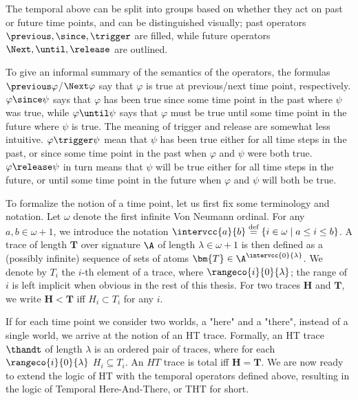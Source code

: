 The temporal above can be split into groups based on whether they act
on past or future time points, and can be distinguished visually; past
operators $\previous, \since, \trigger$ are filled, while future
operators $\Next, \until, \release$ are outlined.

To give an informal summary of the semantics of the operators, the
formulas $\previous \varphi$/$\Next \varphi$ say that $\varphi$ is
true at previous/next time point, respectively.  $\varphi \since \psi$
says that $\varphi$ has been true since some time point in the past
where $\psi$ was true, while $\varphi \until \psi$ says that $\varphi$
must be true until some time point in the future where $\psi$ is true.
The meaning of trigger and release are somewhat less
intuitive. $\varphi \trigger \psi$ mean that $\psi$ has been true
either for all time steps in the past, or since some time point in the
past when $\varphi$ and $\psi$ were both true. $\varphi \release \psi$
in turn means that $\psi$ will be true either for all time steps in
the future, or until some time point in the future when $\varphi$ and
$\psi$ will both be true.

To formalize the notion of a time point, let us first fix some
terminology and notation. Let $\omega$ denote the first infinite Von
Neumann ordinal. For any $a,b \in \omega + 1$, we introduce the
notation
$\intervcc{a}{b} \defeq \{ i \in \omega \mid a \leq i \leq b \}$. A
trace of length $\bm{T}$ over signature $\A$ of length
$\lambda \in \omega + 1$ is then defined as a (possibly infinite)
sequence of sets of atoms $\bm{T} \in \A^{\intervcc{0}{\lambda}}$. We
denote by $T_i$ the $i$-th element of a trace, where
$\rangeco{i}{0}{\lambda}$; the range of $i$ is left implicit when
obvious in the rest of this thesis. For two traces $\bm{H}$ and
$\bm{T}$, we write $\bm{H < T}$ iff $H_i \subset T_i$ for any $i$.

If for each time point we consider two worlds, a "here" and a "there",
instead of a single world, we arrive at the notion of an HT
trace. Formally, an HT trace $\thandt$ of length $\lambda$ is an
ordered pair of traces, where for each $\rangeco{i}{0}{\lambda}$
$H_i \subseteq T_i$. An $HT$ trace is total iff $\bm{H} = \bm{T}$. We
are now ready to extend the logic of HT with the temporal operators
defined above, resulting in the logic of Temporal Here-And-There, or
THT for short.

